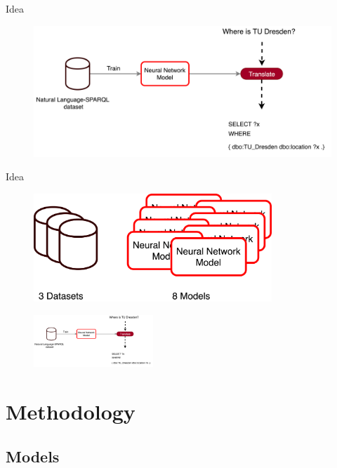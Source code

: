 \documentclass[11pt]{beamer}
\begin{document}
\begin{frame}{Idea}
    \begin{figure}
        \includegraphics[width=\textwidth]{motivation-overview}
    \end{figure}
\end{frame}

\begin{frame}{Idea}
    \begin{figure}
        \includegraphics[width=0.8\textwidth]{datasets-models}
    \end{figure}
    \begin{figure}
        \includegraphics[width=0.4\textwidth]{motivation-overview}
    \end{figure}
\end{frame}

\section{Methodology}

\subsection{Models}
\end{document}
